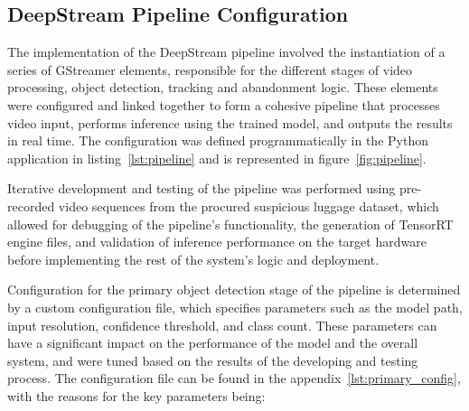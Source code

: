 \subsection{DeepStream Pipeline Configuration}
\label{sec:deepstream_pipeline_configuration}

The implementation of the DeepStream pipeline involved the instantiation of a
series of GStreamer elements, responsible for the different stages of video
processing, object detection, tracking and abandonment logic. These elements
were configured and linked together to form a cohesive pipeline that processes
video input, performs inference using the trained model, and outputs the
results in real time. The configuration was defined programmatically in the
Python application in listing~\ref{lst:pipeline} and is represented in
figure~\ref{fig:pipeline}.

Iterative development and testing of the pipeline was performed using
pre-recorded video sequences from the procured suspicious luggage dataset,
which allowed for debugging of the pipeline's functionality, the generation of
TensorRT engine files, and validation of inference performance on the target
hardware before implementing the rest of the system's logic and deployment.

Configuration for the primary object detection stage of the pipeline is
determined by a custom configuration file, which specifies parameters such as
the model path, input resolution, confidence threshold, and class count. These
parameters can have a significant impact on the performance of the model and
the overall system, and were tuned based on the results of the developing and
testing process. The configuration file can be found in the
appendix~\ref{lst:primary_config}, with the reasons for the key parameters
being:

